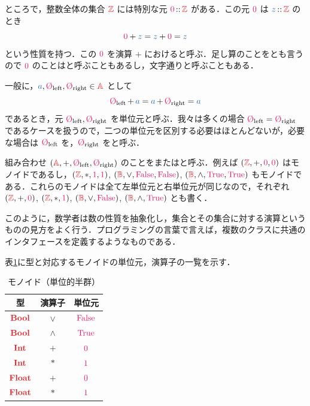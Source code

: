 \documentclass[a5paper,twoside,fleqn,draft]{jsbook}
\begin{document}
ところで，整数全体の集合 $\hSet{Z}$ には特別な元 $\hConstant{0}\hIsTypeOf\hSet{Z}$ がある．この元 $\hConstant{0}$ は $\hVar{z}\hIsTypeOf\hSet{Z}$ のとき
\begin{equation}
  \hConstant{0}+\hVar{z}
  =\hVar{z}+\hConstant{0}
  =\hVar{z}
\end{equation}
という性質を持つ．この $\hConstant{0}$ を演算 $+$ におけると呼ぶ．足し算のことをとも言うので $\hConstant{0}$ のことはと呼ぶこともあるし，文字通りと呼ぶこともある．

一般に，$\hVar{a},\mZeroLeft,\mZeroRight\in\hSet{A}$ として
\begin{equation}
  \label{eq:identity}
  \mZeroLeft\mPlus\hVar{a}
  =\hVar{a}\mPlus\mZeroRight
  =\hVar{a}
\end{equation}
であるとき，元 $\mZeroLeft,\mZeroRight$ を単位元と呼ぶ．我々は多くの場合 $\mZeroLeft=\mZeroRight$ であるケースを扱うので，二つの単位元を区別する必要はほとんどないが，必要な場合は $\mZeroLeft$ を，$\mZeroRight$ をと呼ぶ．

組み合わせ $\hSingleTuppleWith{\hSet{A},\mPlus,\mZeroLeft,\mZeroRight}$ のことをまたはと呼ぶ．例えば $\hSingleTuppleWith{\hSet{Z},+,\hConstant{0},\hConstant{0}}$ はモノイドであるし，$\hSingleTuppleWith{\hSet{Z},*,\hConstant{1},\hConstant{1}}$, $\hSingleTuppleWith{\hSet{B},\hLogicalOr,\hFalse,\hFalse}$, $\hSingleTuppleWith{\hSet{B},\hLogicalAnd,\hTrue,\hTrue}$ もモノイドである．これらのモノイドは全て左単位元と右単位元が同じなので，それぞれ $\hSingleTuppleWith{\hSet{Z},+,\hConstant{0}}$, $\hSingleTuppleWith{\hSet{Z},*,\hConstant{1}}$, $\hSingleTuppleWith{\hSet{B},\hLogicalOr,\hFalse}$, $\hSingleTuppleWith{\hSet{B},\hLogicalAnd,\hTrue}$ とも書く．

このように，数学者は数の性質を抽象化し，集合とその集合に対する演算というものの見方をよく行う．プログラミングの言葉で言えば，複数のクラスに共通のインタフェースを定義するようなものである．

表\ref{tab:monoids}に型と対応するモノイドの単位元，演算子の一覧を示す．

\begin{table}
\caption{モノイド（単位的半群）}
\label{tab:monoids}
\begin{center}
\begin{tabular}{||c||c|c||}
\hline 型&演算子&単位元\\\hline\hline
$\hBool$ &$\vee$&$\hFalse$\\\hline
$\hBool$ &$\wedge$ &$\hTrue$\\\hline\hline
$\hInt$ &$+$ &$\hConstant{0}$\\\hline
$\hInt$ &$*$ &$\hConstant{1}$\\\hline\hline
$\hFloat$ &$+$ &$\hConstant{0}$\\\hline
$\hFloat$ &$*$ &$\hConstant{1}$\\\hline
\end{tabular}
\end{center}
\end{table}
\end{document}
